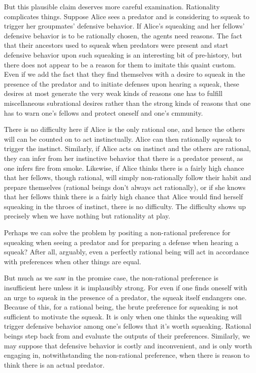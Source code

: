 But this plausible claim deserves more careful examination. Rationality complicates things. Suppose Alice sees a 
predator and is considering to squeak to trigger her groupmates' defensive behavior. If Alice's squeaking and her fellows' 
defensive behavior is to be rationally chosen, the agents need reasons. The fact that their ancestors used to squeak 
when predators were present and start defensive behavior upon such squeaking is an interesting bit of pre-history,
but there does not appear to be a reason for them to imitate this quaint custom. Even if we add the fact that they
find themselves with a desire to squeak in the presence of the predator and to initiate defenses upon hearing a squeak,
these desires at most generate the very weak kinds of reasons one has to fulfill miscellaneous subrational desires rather 
than the strong kinds of reasons that one has to warn one's fellows and protect oneself and one's cmmunity. 

There is no difficulty here if Alice is the only rational one, and hence the others will can be counted on to act instinctually. Alice can
then rationally squeak to trigger the instinct. Similarly, if Alice acts on instinct and the others are rational, they
can infer from her instinctive behavior that there is a predator present, as one infers fire from smoke. Likewise, if Alice thinks there is a fairly high chance that her
fellows, though rational, will simply non-rationally follow their habit and prepare themselves (rational beings don't
always act rationally), or if she knows that her fellows think there is a fairly high 
chance that Alice would find herself squeaking in the throes of instinct, there is no difficulty. The difficulty shows
up precisely when we have nothing but rationality at play.

Perhaps we can solve the problem by positing a non-rational preference for squeaking when seeing a predator and for
preparing a defense when hearing a squeak? After all, arguably, even a perfectly rational being will act in accordance
with preferences when other things are equal. 

But much as we saw in the promise case, the non-rational preference is insufficient here unless it is implausibly strong. For even if one finds oneself
with an urge to squeak in the presence of a predator, the squeak itself endangers one. Because of this, for a rational
being, the brute preference for squeaking is not sufficient to motivate the squeak. It is only when one thinks the
squeaking will trigger defensive behavior among one's fellows that it's worth squeaking. Rational beings step back
from and evaluate the outputs of their preferences. Similarly, we may suppose that
defensive behavior is costly and inconvenient, and is only worth engaging in, notwithstanding the non-rational preference,
when there is reason to think there is an actual predator.

